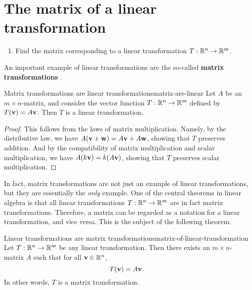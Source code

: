 \section{The matrix of a linear transformation}
\label{sec:matrix-of-transformation}

\begin{outcome}
  \begin{enumerate}
  \item Find the matrix corresponding to a linear transformation
    $T:\mathbb{R}^n\to\mathbb{R}^m$.
  \end{enumerate}
\end{outcome}

An important example of linear transformations are the so-called
\textbf{matrix transformations}%
%
.

\begin{proposition}{Matrix transformations are linear transformations}{matrix-are-linear}
  Let $A$ be an $m\times n$-matrix, and consider the vector function
  $T:\mathbb{R}^n\to \mathbb{R}^m$ defined by $T(\vect{v}) = A\vect{v}$. Then $T$
  is a linear transformation.
\end{proposition}

\begin{proof}
  This follows from the laws of matrix multiplication. Namely, by the
  distributive law, we have
  $A(\vect{v}+\vect{w}) = A\vect{v} + A\vect{w}$, showing that $T$
  preserves addition. And by the compatibility of matrix multiplication
  and scalar multiplication, we have $A(k\vect{v}) = k(A\vect{v})$,
  showing that $T$ preserves scalar multiplication.
\end{proof}

In fact, matrix transformations are not just an example of linear
transformations, but they are essentially the {\em only} example. One
of the central theorems in linear algebra is that all linear
transformations $T:\mathbb{R}^n\to\mathbb{R}^m$ are in fact matrix transformations.
Therefore, a matrix can be regarded as a notation for a linear
transformation, and vice versa. This is the subject of the following
theorem.

\begin{theorem}{Linear transformations are matrix transformations}{matrix-of-linear-transformation}
  Let $T:\mathbb{R}^n\to\mathbb{R}^m$ be any linear transformation. Then there exists
  an $m\times n$-matrix $A$%
   such that for all
  $\vect{v}\in\R^n$,
  \begin{equation*}
    T(\vect{v}) = A\vect{v}.
  \end{equation*}
  In other words, $T$ is a matrix transformation.
\end{theorem}


